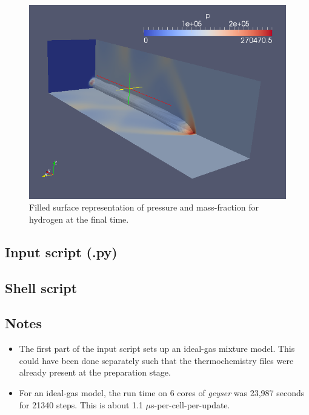  
\begin{figure}[htbp]
\begin{center}
\includegraphics[width=12cm]{../3D/inject-1/inject-p-field-on-walls-with-massf1-contour.png}
\end{center}
\caption{Filled surface representation of pressure and mass-fraction for
  hydrogen at the final time.}
\label{inject-p-fig}
\end{figure}


\newpage

\subsection{Input script (.py)}
\topbar

\bottombar


\subsection{Shell script}
\label{inject-sh-files}
\topbar

\bottombar


\subsection{Notes}
\begin{itemize}
\item The first part of the input script sets up an ideal-gas mixture model.
  This could have been done separately such that the thermochemistry files
  were already present at the preparation stage.
\item For an ideal-gas model, the run time on 6 cores of \textit{geyser} was 23,987 seconds 
  for 21340 steps.  This is about 1.1 $\mu$s-per-cell-per-update. 
\end{itemize}
